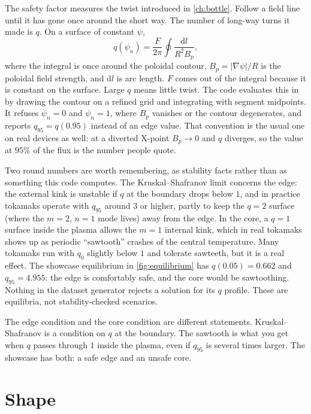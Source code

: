 \documentclass[11pt,a4paper,oneside,openany]{book}
\newcommand{\code}{\path}
\numberwithin{equation}{chapter}
\newcommand{\psin}{\psi_{n}}
\newcommand{\grad}{\nabla}
\theoremstyle{definition}
\begin{document}
The safety factor measures the twist introduced in \cref{ch:bottle}. Follow a field line until it has gone once around the short way. The number of long-way turns it made is \(q\). On a surface of constant \(\psi\),
\begin{equation}
\label{eq:q}
q(\psin)=\frac{F}{2\pi}\oint\frac{\mathrm{d}l}{R^{2} B_{p}},
\end{equation}
where the integral is once around the poloidal contour, \(B_{p}=\lvert\grad\psi\rvert/R\) is the poloidal field strength, and \(\mathrm{d}l\) is arc length. \(F\) comes out of the integral because it is constant on the surface. Large \(q\) means little twist. The code evaluates this in \code{eval/metrics.py} by drawing the contour on a refined grid and integrating with segment midpoints. It refuses \(\psin=0\) and \(\psin=1\), where \(B_{p}\) vanishes or the contour degenerates, and reports \(q_{95}=q(0.95)\) instead of an edge value. That convention is the usual one on real devices as well: at a diverted X-point \(B_{p}\to 0\) and \(q\) diverges, so the value at \(95\%\) of the flux is the number people quote.

Two round numbers are worth remembering, as stability facts rather than as something this code computes. The Kruskal--Shafranov limit concerns the edge: the external kink is unstable if \(q\) at the boundary drops below \(1\), and in practice tokamaks operate with \(q_{95}\) around \(3\) or higher, partly to keep the \(q=2\) surface (where the \(m=2\), \(n=1\) mode lives) away from the edge. In the core, a \(q=1\) surface inside the plasma allows the \(m=1\) internal kink, which in real tokamaks shows up as periodic ``sawtooth'' crashes of the central temperature. Many tokamaks run with \(q_{0}\) slightly below \(1\) and tolerate sawteeth, but it is a real effect. The showcase equilibrium in \cref{fig:equilibrium} has \(q(0.05)=0.662\) and \(q_{95}=4.955\): the edge is comfortably safe, and the core would be sawtoothing. Nothing in the dataset generator rejects a solution for its \(q\) profile. These are equilibria, not stability-checked scenarios.

The edge condition and the core condition are different statements. Kruskal--Shafranov is a condition on \(q\) at the boundary. The sawtooth is what you get when \(q\) passes through \(1\) inside the plasma, even if \(q_{95}\) is several times larger. The showcase has both: a safe edge and an unsafe core.

\section{Shape}
\end{document}
